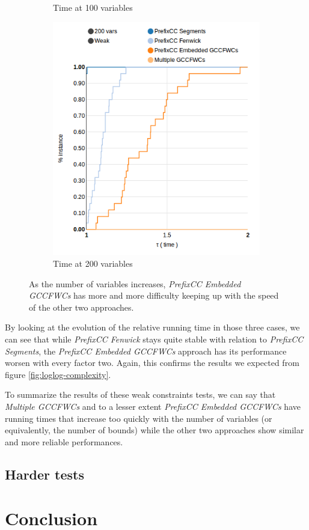 \documentclass[a4paper,10pt]{article}
\begin{document}
\begin{figure}[h]
\begin{subfigure}[b]{0.3\textwidth}
        \caption{Time at 100 variables}
    \end{subfigure}
    \quad
    \begin{subfigure}[b]{0.3\textwidth}
        \includegraphics[width=\textwidth]{img/weak-200vars-time}
        \caption{Time at 200 variables}
    \end{subfigure}
    
    \caption{As the number of variables increases, \emph{PrefixCC Embedded GCCFWCs} has more and more difficulty keeping up with the speed of the other two approaches.}
    \label{fig:weak-separate}
\end{figure}

By looking at the evolution of the relative running time in those three cases, we can see that while \emph{PrefixCC Fenwick} stays quite stable with relation to \emph{PrefixCC Segments}, the \emph{PrefixCC Embedded GCCFWCs} approach has its performance worsen with every factor two. Again, this confirms the results we expected from figure \ref{fig:loglog-complexity}.

To summarize the results of these weak constraints tests, we can say that \emph{Multiple GCCFWCs} and to a lesser extent \emph{PrefixCC Embedded GCCFWCs} have running times that increase too quickly with the number of variables (or equivalently, the number of bounds) while the other two approaches show similar and more reliable performances.

\subsection{Harder tests}

\section{Conclusion}
\end{document}
